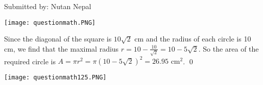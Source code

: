 

    
    Submitted by: Nutan Nepal
    \begin{questions}

        \begin{minipage}{.69\textwidth}
        
        \end{minipage}
        \begin{minipage}{.26\textwidth}
            \begin{flushright}
                \texttt{[image: questionmath.PNG]}
            \end{flushright}
        \end{minipage}

        \begin{solution}

            \begin{minipage}{.69\textwidth}
            Since the diagonal of the square is $10\sqrt{2}$ cm and
            the radius of each circle is 10 cm, we find that the
            maximal radius $r=10 -\frac{10}{\sqrt{2}}
            =10-5\sqrt{2}$. So the area of the required circle
            is $A=\pi r^2=\pi (10-5\sqrt{2})^2 = 26.95 \text{ cm}^2$.
            \qed
            \end{minipage}
            \begin{minipage}{.3\textwidth}
                \begin{flushright}
                    \texttt{[image: questionmath125.PNG]}
                \end{flushright}
            \end{minipage}
        \end{solution}
    \end{questions}
